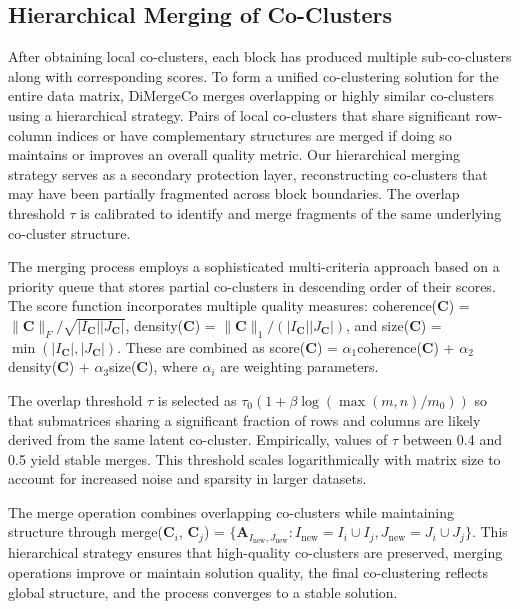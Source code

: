 \documentclass[journal]{IEEEtran}
\begin{document}
\subsection{Hierarchical Merging of Co-Clusters}
\label{subsec:hierarchical-merging}
After obtaining local co-clusters, each block has produced multiple sub-co-clusters along with corresponding scores. To form a unified co-clustering solution for the entire data matrix, DiMergeCo merges overlapping or highly similar co-clusters using a hierarchical strategy. Pairs of local co-clusters that share significant row-column indices or have complementary structures are merged if doing so maintains or improves an overall quality metric. {\color{blue}Our hierarchical merging strategy serves as a secondary protection layer, reconstructing co-clusters that may have been partially fragmented across block boundaries. The overlap threshold $\tau$ is calibrated to identify and merge fragments of the same underlying co-cluster structure.}

The merging process employs a sophisticated multi-criteria approach based on a priority queue that stores partial co-clusters in descending order of their scores. The score function incorporates multiple quality measures: coherence($\mathbf{C}$) = $\|\mathbf{C}\|_F/\sqrt{|I_{\mathbf{C}}||J_{\mathbf{C}}|}$, density($\mathbf{C}$) = $\|\mathbf{C}\|_1/(|I_{\mathbf{C}}||J_{\mathbf{C}}|)$, and size($\mathbf{C}$) = $\min(|I_{\mathbf{C}}|, |J_{\mathbf{C}}|)$. These are combined as score($\mathbf{C}$) = $\alpha_1$coherence($\mathbf{C}$) + $\alpha_2$density($\mathbf{C}$) + $\alpha_3$size($\mathbf{C}$), where $\alpha_i$ are weighting parameters.

The overlap threshold $\tau$ is selected as $\tau_0(1 + \beta\log(\max(m,n)/m_0))$ so that submatrices sharing a significant fraction of rows and columns are likely derived from the same latent co-cluster. Empirically, values of $\tau$ between 0.4 and 0.5 yield stable merges. This threshold scales logarithmically with matrix size to account for increased noise and sparsity in larger datasets.

The merge operation combines overlapping co-clusters while maintaining structure through merge($\mathbf{C}_i$, $\mathbf{C}_j$) = $\{\mathbf{A}_{I_{\text{new}}, J_{\text{new}}} : I_{\text{new}} = I_i \cup I_j, J_{\text{new}} = J_i \cup J_j\}$. This hierarchical strategy ensures that high-quality co-clusters are preserved, merging operations improve or maintain solution quality, the final co-clustering reflects global structure, and the process converges to a stable solution.
\end{document}
